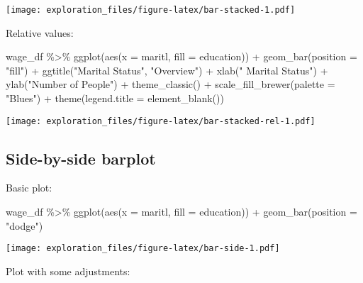 \documentclass[
]{book}
\newenvironment{Shaded}{\begin{snugshade}}{\end{snugshade}}
\newcommand{\AttributeTok}[1]{\textcolor[rgb]{0.77,0.63,0.00}{#1}}
\newcommand{\FunctionTok}[1]{\textcolor[rgb]{0.00,0.00,0.00}{#1}}
\newcommand{\NormalTok}[1]{#1}
\newcommand{\SpecialCharTok}[1]{\textcolor[rgb]{0.00,0.00,0.00}{#1}}
\newcommand{\StringTok}[1]{\textcolor[rgb]{0.31,0.60,0.02}{#1}}
\begin{document}
\texttt{[image: exploration\_files/figure-latex/bar-stacked-1.pdf]}

Relative values:

\begin{Shaded}
\begin{Highlighting}[]
\NormalTok{wage\_df }\SpecialCharTok{\%\textgreater{}\%} 
  \FunctionTok{ggplot}\NormalTok{(}\FunctionTok{aes}\NormalTok{(}\AttributeTok{x =}\NormalTok{ maritl, }\AttributeTok{fill =}\NormalTok{ education)) }\SpecialCharTok{+}
  \FunctionTok{geom\_bar}\NormalTok{(}\AttributeTok{position =} \StringTok{"fill"}\NormalTok{) }\SpecialCharTok{+}
  \FunctionTok{ggtitle}\NormalTok{(}\StringTok{"Marital Status"}\NormalTok{, }\StringTok{"Overview"}\NormalTok{) }\SpecialCharTok{+}
  \FunctionTok{xlab}\NormalTok{(}\StringTok{" Marital Status"}\NormalTok{) }\SpecialCharTok{+}
  \FunctionTok{ylab}\NormalTok{(}\StringTok{"Number of People"}\NormalTok{) }\SpecialCharTok{+}
  \FunctionTok{theme\_classic}\NormalTok{() }\SpecialCharTok{+}
  \FunctionTok{scale\_fill\_brewer}\NormalTok{(}\AttributeTok{palette =} \StringTok{"Blues"}\NormalTok{) }\SpecialCharTok{+}
  \FunctionTok{theme}\NormalTok{(}\AttributeTok{legend.title =} \FunctionTok{element\_blank}\NormalTok{())}
\end{Highlighting}
\end{Shaded}

\texttt{[image: exploration\_files/figure-latex/bar-stacked-rel-1.pdf]}

\hypertarget{side-by-side-barplot}{%
\subsection{Side-by-side barplot}\label{side-by-side-barplot}}

Basic plot:

\begin{Shaded}
\begin{Highlighting}[]
\NormalTok{wage\_df }\SpecialCharTok{\%\textgreater{}\%} 
  \FunctionTok{ggplot}\NormalTok{(}\FunctionTok{aes}\NormalTok{(}\AttributeTok{x =}\NormalTok{ maritl, }\AttributeTok{fill =}\NormalTok{ education)) }\SpecialCharTok{+}
  \FunctionTok{geom\_bar}\NormalTok{(}\AttributeTok{position =} \StringTok{"dodge"}\NormalTok{) }
\end{Highlighting}
\end{Shaded}

\texttt{[image: exploration\_files/figure-latex/bar-side-1.pdf]}

Plot with some adjustments:
\end{document}
